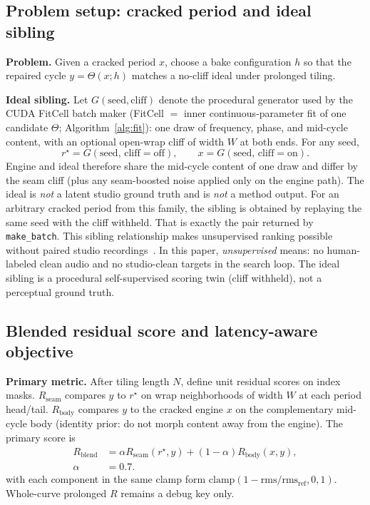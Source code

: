 \subsection{Problem setup: cracked period and ideal sibling}
\label{sec:ideal-tile}

\textbf{Problem.} Given a cracked period $x$, choose a bake configuration $h$ so that the repaired cycle $y=\Theta(x;h)$ matches a no-cliff ideal under prolonged tiling.

\textbf{Ideal sibling.}
Let $G(\mathrm{seed},\mathrm{cliff})$ denote the procedural generator used by the CUDA FitCell batch maker
(FitCell $=$ inner continuous-parameter fit of one candidate $\Theta$; Algorithm~\ref{alg:fit}):
one draw of frequency, phase, and mid-cycle content, with an optional open-wrap cliff of width $W$ at both ends.
For any seed,
\begin{equation}
\label{eq:G-siblings}
r^{\star}=G(\mathrm{seed},\,\mathrm{cliff{=}off}),\qquad
x=G(\mathrm{seed},\,\mathrm{cliff{=}on}).
\end{equation}
Engine and ideal therefore share the mid-cycle content of one draw and differ by the seam cliff (plus any seam-boosted noise applied only on the engine path).
The ideal is \emph{not} a latent studio ground truth and is \emph{not} a method output.
For an arbitrary cracked period from this family, the sibling is obtained by replaying the same seed with the cliff withheld.
That is exactly the pair returned by \texttt{make\_batch}.
This sibling relationship makes unsupervised ranking possible without paired studio recordings~\cite{lehtinen2018,kashyap2021n2n}.
In this paper, \emph{unsupervised} means: no human-labeled clean audio and no studio-clean targets in the search loop.
The ideal sibling is a procedural self-supervised scoring twin (cliff withheld), not a perceptual ground truth.

\subsection{Blended residual score and latency-aware objective}
\label{sec:residual-score}

\textbf{Primary metric.}
After tiling length $N$, define unit residual scores on index masks.
$R_{\mathrm{seam}}$ compares $y$ to $r^{\star}$ on wrap neighborhoods of width $W$ at each period head/tail.
$R_{\mathrm{body}}$ compares $y$ to the cracked engine $x$ on the complementary mid-cycle body (identity prior: do not morph content away from the engine).
The primary score is
\begin{equation}
\label{eq:R-blend}
\begin{aligned}
R_{\mathrm{blend}}
&=\alpha R_{\mathrm{seam}}(r^{\star},y)+(1-\alpha)R_{\mathrm{body}}(x,y),\\
\alpha&=0.7.
\end{aligned}
\end{equation}
with each component in the same clamp form
$\mathrm{clamp}(1-\mathrm{rms}/\mathrm{rms}_{\mathrm{ref}},0,1)$.
Whole-curve prolonged $R$ remains a debug key only.

